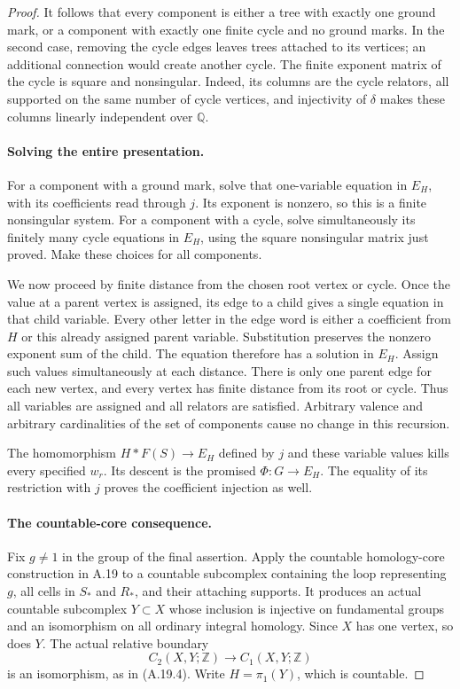 \begin{proof}
It follows that every component is either a tree with
exactly one ground mark, or a component with exactly one
finite cycle and no ground marks. In the second case,
removing the cycle edges leaves trees attached to its
vertices; an additional connection would create another
cycle. The finite exponent matrix of the cycle is square
and nonsingular. Indeed, its columns are the cycle
relators, all supported on the same number of cycle
vertices, and injectivity of $\delta$ makes these columns
linearly independent over $\mathbb Q$.

\paragraph{Solving the entire presentation.}
For a component with a ground mark, solve that one-variable
equation in $E_H$, with its coefficients read through $j$.
Its exponent is nonzero, so this is a finite nonsingular
system. For a component with a cycle, solve simultaneously
its finitely many cycle equations in $E_H$, using the
square nonsingular matrix just proved. Make these choices
for all components.

We now proceed by finite distance from the chosen root
vertex or cycle. Once the value at a parent vertex is
assigned, its edge to a child gives a single equation in
that child variable. Every other letter in the edge word
is either a coefficient from $H$ or this already assigned
parent variable. Substitution preserves the nonzero
exponent sum of the child. The equation therefore has a
solution in $E_H$. Assign such values simultaneously at
each distance. There is only one parent edge for each
new vertex, and every vertex has finite distance from
its root or cycle. Thus all variables are assigned and
all relators are satisfied. Arbitrary valence and
arbitrary cardinalities of the set of components cause
no change in this recursion.

The homomorphism $H*F(S)\to E_H$ defined by $j$ and these
variable values kills every specified $w_r$. Its descent
is the promised $\Phi:G\to E_H$. The equality of its
restriction with $j$ proves the coefficient injection
as well.

\paragraph{The countable-core consequence.}
Fix $g\ne1$ in the group of the final assertion. Apply
the countable homology-core construction in A.19 to a
countable subcomplex containing the loop representing
$g$, all cells in $S_*$ and $R_*$, and their attaching
supports. It produces an actual countable subcomplex
$Y\subset X$ whose inclusion is injective on fundamental
groups and an isomorphism on all ordinary integral
homology. Since $X$ has one vertex, so does $Y$.
The actual relative boundary
\[
 C_2(X,Y;\mathbb Z)\longrightarrow C_1(X,Y;\mathbb Z)
\]
is an isomorphism, as in (A.19.4). Write
$H=\pi_1(Y)$, which is countable.


\end{proof}
